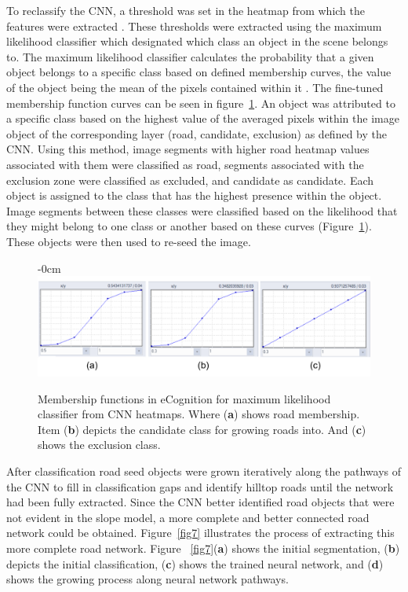 \documentclass[remotesensing,article,submit,pdftex,moreauthors]{Definitions/mdpi}
\begin{document}
To reclassify the CNN, a threshold was set in the heatmap from which the features were extracted \cite{luca, prakash, timilsina}. These thresholds were extracted using the maximum likelihood classifier which designated which class an object in the scene belongs to. The maximum likelihood classifier calculates the probability that a given object belongs to a specific class based on defined membership curves, the value of the object being the mean of the pixels contained within it \cite{richards}. The fine-tuned membership function curves can be seen in figure~\ref{fig6}. An object was attributed to a specific class based on the highest value of the averaged pixels within the image object of the corresponding layer (road, candidate, exclusion) as defined by the CNN. Using this method, image segments with higher road heatmap values associated with them were classified as road, segments associated with the exclusion zone were classified as excluded, and candidate as candidate. Each object is assigned to the class that has the highest presence within the object. Image segments between these classes were classified based on the likelihood that they might belong to one class or another based on these curves (Figure~\ref{fig6}). These objects were then used to re-seed the image.

\begin{figure}[H]
\begin{adjustwidth}{-\extralength}{0cm}
\centering
\includegraphics[width=15.5cm]{membership.png}
\end{adjustwidth}
\caption{Membership functions in eCognition for maximum likelihood classifier from CNN heatmaps. Where (\textbf{a}) shows road membership. Item (\textbf{b}) depicts the candidate class for growing roads into. And (\textbf{c}) shows the exclusion class. \label{fig6}}
\end{figure}  

After classification road seed objects were grown iteratively along the pathways of the CNN to fill in classification gaps and identify hilltop roads until the network had been fully extracted. Since the CNN better identified road objects that were not evident in the slope model, a more complete and better connected road network could be obtained. Figure~\ref{fig7} illustrates the process of extracting this more complete road network. Figure ~\ref{fig7}(\textbf{a}) shows the initial segmentation, (\textbf{b}) depicts the initial classification, (\textbf{c}) shows the trained neural network, and (\textbf{d}) shows the growing process along neural network pathways. 
\end{document}
